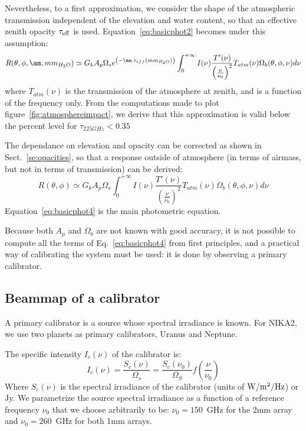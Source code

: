 Nevertheless, to a first approximation, we consider the shape of the atmospheric
transmission independent of the elevation and water content, so that an
effective zenith opacity $\tau_{\rm{eff}}$ is used.
Equation~\ref{eq:basicphot2} becomes under this assumption: 
\begin{equation}
R(\theta, \phi, \am, mm_{H_{2}O}) \simeq G_{k}  A_{p}\Omega_{s} e^{\left(-\am
  . \tau_{eff}(mm_{H_{2}O})\right)} \int_{0}^{+\infty} I(\nu)
\frac{T'(\nu)}{\left(\frac{\nu}{\nu_{0}}\right)^{2}} T_{atm}(\nu)
\Omega_{b} (\theta, \phi, \nu) d\nu 
\label{eq:basicphot3}
\end{equation}
where $T_{atm}(\nu)$ is the transmission of the atmosphere at zenith,
and is a function of the frequency only. From the computations made to
plot figure~\ref{fig:atmosphereimpact}, we derive that this approximation 
is valid below the percent level for $\tau_{225GHz} < 0.35$

The dependance on elevation and opacity can be corrected as shown in
Sect.~\ref{se:opacities}, so that a response outside of atmosphere (in
terms of airmass, but not in terms of transmission) can be derived:
\begin{equation}
R(\theta, \phi) \simeq G_{k}  A_{p}\Omega_{s} \int_{0}^{+\infty} I(\nu)
\frac{T'(\nu)}{\left(\frac{\nu}{\nu_{0}}\right)^{2}} T_{atm}(\nu) \Omega_{b} (\theta, \phi, \nu)  d\nu 
\label{eq:basicphot4}
\end{equation}
Equation~\ref{eq:basicphot4} is the main photometric equation.

Because both $A_{p}$ and $ \Omega_{b} $ are not known with good
accuracy, it is not possible to compute all the terms of
Eq.~\ref{eq:basicphot4} from first principles, and a practical way of
calibrating the system must be used: it is done by observing a primary
calibrator.

\subsection{Beammap of a calibrator}

A primary calibrator is a source whose spectral irradiance is
known. For NIKA2, we use two planets as primary calibrators, Uranus
and Neptune.

The specific intensity $I_{c}(\nu)$ of the
calibrator is:
\begin{equation}
I_{c}(\nu) =  \frac{S_{c}(\nu)}{\Omega_{s}} =\frac{ S_{c}
(\nu_{0})}{\Omega_{S}} f(\frac{\nu}{\nu_{0}})  
\end{equation}
Where $S_{c}(\nu)$ is the spectral irradiance of the calibrator (units
of $\rm W/m^{2}/Hz$) or Jy. We parametrize the source spectral irradiance
as a function of a reference frequency $\nu_{0}$ that we choose
arbitrarily to be: $\nu_{0} = 150$~GHz for the 2mm array and $\nu_{0}
= 260$~GHz for both 1mm arrays. 


